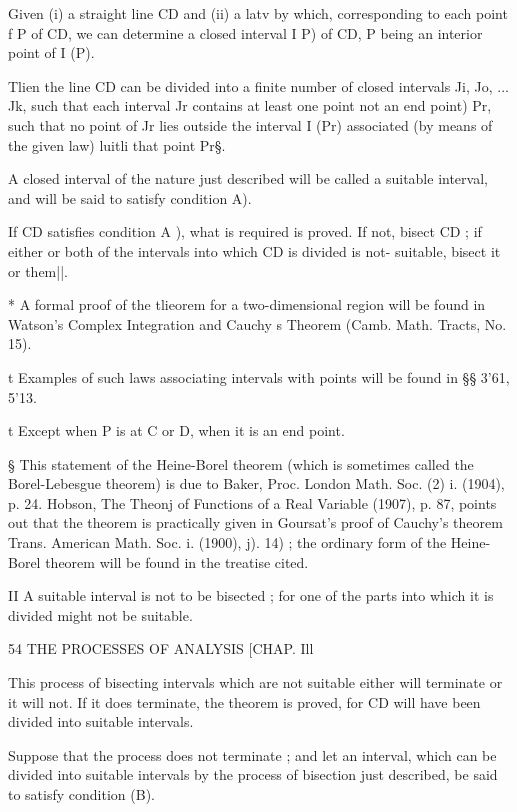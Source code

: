 Given (i) a straight line CD and (ii) a latv by which, corresponding to 
each point f P of CD, we can determine a closed interval I P) of CD, P being 
an interior  point of I (P). 

Tlien the line CD can be divided into a finite number of closed intervals 
Ji, Jo, ... Jk, such that each interval Jr contains at least one point  not an end 
point) Pr, such that no point of Jr lies outside the interval I (Pr) associated 
(by means of the given law) luitli that point Pr§. 

A closed interval of the nature just described will be called a suitable 
interval, and will be said to satisfy condition  A). 

If CD satisfies condition  A ), what is required is proved. If not, bisect CD ; 
if either or both of the intervals into which CD is divided is not- suitable, 
bisect it or them||. 

* A formal proof of the tlieorem for a two-dimensional region will be found in Watson's 
Complex Integration and Cauchy s Theorem (Camb. Math. Tracts, No. 15). 

t Examples of such laws associating intervals with points will be found in §§ 3'61, 5'13. 

t Except when P is at C or D, when it is an end point. 

§ This statement of the Heine-Borel theorem (which is sometimes called the Borel-Lebesgue 
theorem) is due to Baker, Proc. London Math. Soc. (2) i. (1904), p. 24. Hobson, The Theonj of 
Functions of a Real Variable (1907), p. 87, points out that the theorem is practically given in 
Goursat's proof of Cauchy's theorem  Trans. American Math. Soc. i. (1900), j). 14) ; the ordinary 
form of the Heine-Borel theorem will be found in the treatise cited. 

II A suitable interval is not to be bisected ; for one of the parts into which it is divided 
might not be suitable. 



54 THE PROCESSES OF ANALYSIS [CHAP. Ill 

This process of bisecting intervals which are not suitable either will 
terminate or it will not. If it does terminate, the theorem is proved, for CD 
will have been divided into suitable intervals. 

Suppose that the process does not terminate ; and let an interval, which 
can be divided into suitable intervals by the process of bisection just described, 
be said to satisfy condition (B). 

